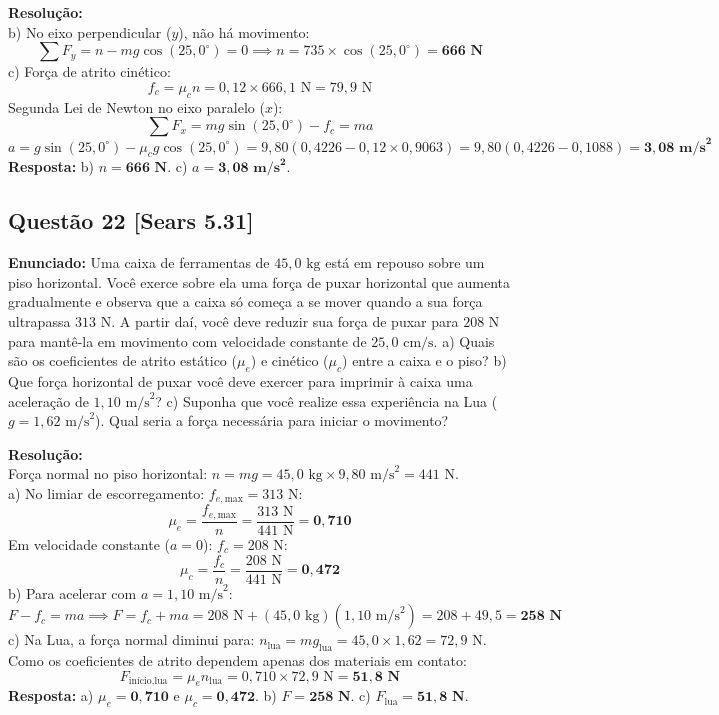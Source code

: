 \documentclass[11pt,a4paper]{article}
\begin{document}
\noindent
\textbf{Resolução:}\\
b) No eixo perpendicular ($y$), não há movimento:
\[ \sum F_y = n - mg\cos(25,0^\circ) = 0 \implies n = 735 \times \cos(25,0^\circ) = \mathbf{666\text{ N}} \]
c) Força de atrito cinético:
\[ f_c = \mu_c n = 0,12 \times 666,1\text{ N} = 79,9\text{ N} \]
Segunda Lei de Newton no eixo paralelo ($x$):
\[ \sum F_x = mg\sin(25,0^\circ) - f_c = m a \]
\[ a = g\sin(25,0^\circ) - \mu_c g\cos(25,0^\circ) = 9,80(0,4226 - 0,12 \times 0,9063) = 9,80(0,4226 - 0,1088) = \mathbf{3,08\text{ m/s}^2} \]
\textbf{Resposta:} b) $n = \mathbf{666\text{ N}}$. c) $a = \mathbf{3,08\text{ m/s}^2}$.

\vspace{0.3cm}
\subsection*{Questão 22 [Sears 5.31]}
\textbf{Enunciado:} Uma caixa de ferramentas de $45,0\text{ kg}$ está em repouso sobre um piso horizontal. Você exerce sobre ela uma força de puxar horizontal que aumenta gradualmente e observa que a caixa só começa a se mover quando a sua força ultrapassa $313\text{ N}$. A partir daí, você deve reduzir sua força de puxar para $208\text{ N}$ para mantê-la em movimento com velocidade constante de $25,0\text{ cm/s}$. a) Quais são os coeficientes de atrito estático ($\mu_e$) e cinético ($\mu_c$) entre a caixa e o piso? b) Que força horizontal de puxar você deve exercer para imprimir à caixa uma aceleração de $1,10\text{ m/s}^2$? c) Suponha que você realize essa experiência na Lua ($g = 1,62\text{ m/s}^2$). Qual seria a força necessária para iniciar o movimento?

\noindent
\textbf{Resolução:}\\
Força normal no piso horizontal: $n = mg = 45,0\text{ kg} \times 9,80\text{ m/s}^2 = 441\text{ N}$.\\
a) No limiar de escorregamento: $f_{e,\text{max}} = 313\text{ N}$:
\[ \mu_e = \frac{f_{e,\text{max}}}{n} = \frac{313\text{ N}}{441\text{ N}} = \mathbf{0,710} \]
Em velocidade constante ($a = 0$): $f_c = 208\text{ N}$:
\[ \mu_c = \frac{f_c}{n} = \frac{208\text{ N}}{441\text{ N}} = \mathbf{0,472} \]
b) Para acelerar com $a = 1,10\text{ m/s}^2$:
\[ F - f_c = m a \implies F = f_c + m a = 208\text{ N} + (45,0\text{ kg})(1,10\text{ m/s}^2) = 208 + 49,5 = \mathbf{258\text{ N}} \]
c) Na Lua, a força normal diminui para: $n_{\text{lua}} = m g_{\text{lua}} = 45,0 \times 1,62 = 72,9\text{ N}$.\\
Como os coeficientes de atrito dependem apenas dos materiais em contato:
\[ F_{\text{início,lua}} = \mu_e n_{\text{lua}} = 0,710 \times 72,9\text{ N} = \mathbf{51,8\text{ N}} \]
\textbf{Resposta:} a) $\mu_e = \mathbf{0,710}$ e $\mu_c = \mathbf{0,472}$. b) $F = \mathbf{258\text{ N}}$. c) $F_{\text{lua}} = \mathbf{51,8\text{ N}}$.
\end{document}
